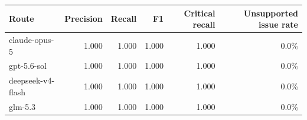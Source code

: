 \begin{tabular}{lrrrrr}
\toprule
Route & Precision & Recall & F1 & Critical recall & Unsupported issue rate \\
\midrule
claude-opus-5 & 1.000 & 1.000 & 1.000 & 1.000 & 0.0\% \\
gpt-5.6-sol & 1.000 & 1.000 & 1.000 & 1.000 & 0.0\% \\
deepseek-v4-flash & 1.000 & 1.000 & 1.000 & 1.000 & 0.0\% \\
glm-5.3 & 1.000 & 1.000 & 1.000 & 1.000 & 0.0\% \\
\bottomrule
\end{tabular}
